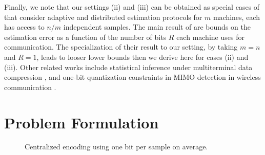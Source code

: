 \documentclass[letterpaper, conference, 11pt]{IEEEtran}      %
\begin{document}
Finally, we note that our settings (ii) and (iii) can be obtained as special cases of 
\cite{zhang2013information} that consider adaptive and distributed estimation protocols for $m$ machines, each has access to $n/m$ independent samples. The main result of \cite{zhang2013information} are bounds on the estimation error as a function of the number of bits $R$ each machine uses for communication. The specialization of their result to our setting, by taking $m=n$ and $R=1$, leads to looser lower bounds then we derive here for cases (ii) and (iii). Other related works include statistical inference under multiterminal data compression \cite{han1987hypothesis, zhang1988estimation}, and one-bit quantization constraints 
in MIMO detection in wireless communication \cite{singh2009limits}. \\


\section{Problem Formulation \label{sec:problem}}

\begin{figure}
\begin{center}
\end{center}
\caption{\label{fig:centralized} Centralized encoding using one bit per sample on average.}
\end{figure}
\end{document}
